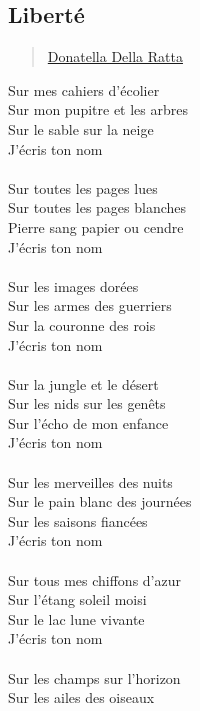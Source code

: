 \subsection{Liberté}\label{libertuxe9}

\begin{quote}
\hyperlink{donatella-della-ratta}{Donatella
Della Ratta}
\end{quote}

\noindent
Sur mes cahiers d\textquoteright écolier \\
Sur mon pupitre et les arbres \\
Sur le sable sur la neige \\
J\textquoteright écris ton nom \\
 \\
Sur toutes les pages lues \\
Sur toutes les pages blanches \\
Pierre sang papier ou cendre \\
J\textquoteright écris ton nom \\
 \\
Sur les images dorées \\
Sur les armes des guerriers \\
Sur la couronne des rois \\
J\textquoteright écris ton nom \\
 \\
Sur la jungle et le désert \\
Sur les nids sur les genêts \\
Sur l\textquoteright écho de mon enfance \\
J\textquoteright écris ton nom \\
 \\
Sur les merveilles des nuits \\
Sur le pain blanc des journées \\
Sur les saisons fiancées \\
J\textquoteright écris ton nom \\
 \\
Sur tous mes chiffons d\textquoteright azur \\
Sur l\textquoteright étang soleil moisi \\
Sur le lac lune vivante \\
J\textquoteright écris ton nom \\
 \\
 \newpage
 \noindent
Sur les champs sur l\textquoteright horizon \\
Sur les ailes des oiseaux \\
